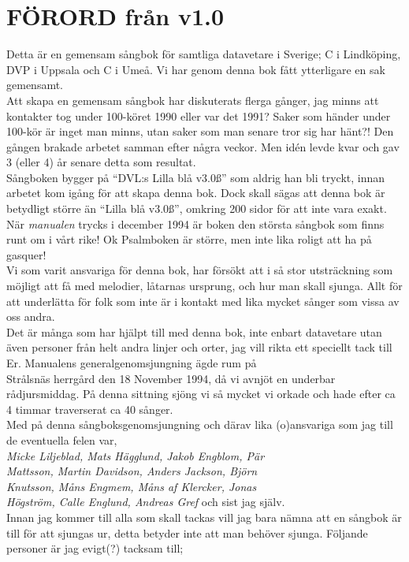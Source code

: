 \documentclass[a6paper,fontsize=10pt,twoside,openright]{scrbook}
\begin{document}
\section{FÖRORD från v1.0}\vspace{10pt}
\hspace{\indent} Detta är en gemensam sångbok för samtliga datavetare
i Sverige; C i Lindköping, DVP i Uppsala och C i Umeå. Vi har genom
denna bok fått ytterligare en sak gemensamt.\\ \indent Att skapa en
gemensam sångbok har diskuterats flerga gånger, jag minns att
kontakter tog under 100-köret 1990 eller var det 1991?  Saker som
händer under 100-kör är inget man minns, utan saker som man senare
tror sig har hänt?! Den gången brakade arbetet samman efter några
veckor. Men idén levde kvar och gav 3 (eller 4) år senare detta som
resultat.\\ \indent Sångboken bygger på ``DVL:s Lilla blå v3.0\ss''
som aldrig han bli tryckt, innan arbetet kom igång för att skapa denna
bok. Dock skall sägas att denna bok är betydligt större än ``Lilla blå
v3.0\ss'', omkring 200 sidor för att inte vara exakt.\\ \indent När
\textit{manualen} trycks i december 1994 är boken den största sångbok
som finns runt om i vårt rike! Ok Psalmboken är större, men inte lika
roligt att ha på gasquer!\\ \indent Vi som varit ansvariga för denna
bok, har försökt att i så stor utsträckning som möjligt att få med
melodier, låtarnas ursprung, och hur man skall sjunga. Allt för att
underlätta för folk som inte är i kontakt med lika mycket sånger som
vissa av oss andra.\\ \indent Det är många som har hjälpt till med
denna bok, inte enbart datavetare utan även personer från helt andra
linjer och orter, jag vill rikta ett speciellt tack till Er.
\newpage
\indent Manualens generalgenomsjungning ägde rum på\\ Strålsnäs
herrgård den 18 November 1994, då vi avnjöt en underbar
rådjursmiddag. På denna sittning sjöng vi så mycket vi orkade och hade
efter ca 4 timmar traverserat ca 40 sånger.\\ \indent Med på denna
sångboksgenomsjungning och därav lika (o)ansvariga som jag till de
eventuella felen var,\\ \textit{Micke Liljeblad, Mats Hägglund, Jakob
  Engblom, Pär\\ Mattsson, Martin Davidson, Anders Jackson,
  Björn\\ Knutsson, Måns Engmem, Måns af Klercker, Jonas\\ Högström,
  Calle Englund, Andreas Gref} och sist jag själv.\\ \indent Innan jag
kommer till alla som skall tackas vill jag bara nämna att en sångbok
är till för att sjungas ur, detta betyder inte att man behöver
sjunga. Följande personer är jag evigt(?)  tacksam till;\\
\end{document}

